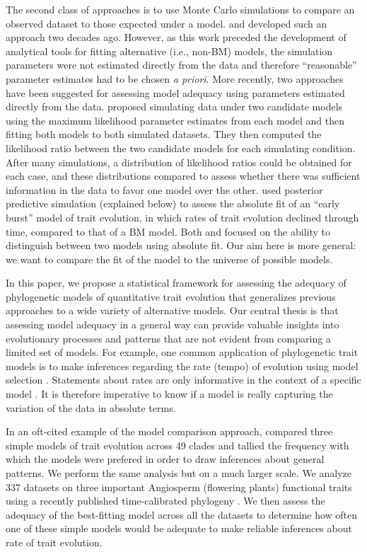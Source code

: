 The second class of approaches is to use Monte Carlo simulations to compare an observed dataset to those expected under a model. \citet{Garland1993} and \citet{Diaz1996} developed such an approach two decades ago. However, as this work preceded the development of analytical tools for fitting alternative (i.e., non-BM) models, the simulation parameters were not estimated directly from the data and therefore ``reasonable'' parameter estimates had to be chosen \emph{a priori}. More recently, two approaches have been suggested for assessing model adequacy using parameters estimated directly from the data. \citet{Boettiger2012} proposed simulating data under two candidate models using the maximum likelihood parameter estimates from each model and then fitting both models to both simulated datasets. They then computed the likelihood ratio between the two candidate models for each simulating condition. After many simulations, a distribution of likelihood ratios could be obtained for each case, and these distributions compared to assess whether there was sufficient information in the data to favor one model over the other. 
\citet{SlaterPennell} used posterior predictive simulation (explained below) to assess the absolute fit of an ``early burst'' model of trait evolution, in which rates of trait evolution declined through time, compared to that of a BM model. Both \citet{Boettiger2012} and \citet{SlaterPennell} focused on the ability to distinguish between two models using absolute fit. Our aim here is more general: we want to compare the fit of the model to the universe of possible models. 

In this paper, we propose a statistical framework for assessing the adequacy of phylogenetic models of quantitative trait evolution that generalizes previous approaches to a wide variety of alternative models. Our central thesis is that assessing model adequacy in a general way can provide valuable insights into evolutionary processes and patterns that are not evident from comparing a limited set of models. For example, one common application of phylogenetic trait models is to make inferences regarding the rate (tempo) of evolution using model selection \citep[e.g.,][]{Mooers1999, Harmon2010, Hunt2012, SlaterMEE}. Statements about rates are only informative in the context of a specific model \citep{Hunt2012}. It is therefore imperative to know if a model is really capturing the variation of the data in absolute terms. 

In an oft-cited example of the model comparison approach, \citet{Harmon2010} compared three simple models of trait evolution across 49 clades and tallied the frequency with which the models were prefered in order to draw inferences about general patterns. We perform the same analysis but on a much larger scale. We analyze 337 datasets on three important Angiosperm (flowering plants) functional traits using a recently published time-calibrated phylogeny \citep{Zanne2013}. We then assess the adequacy of the best-fitting model across all the datasets to determine how often one of these simple models would be adequate to make reliable inferences about rate of trait evolution.
 

